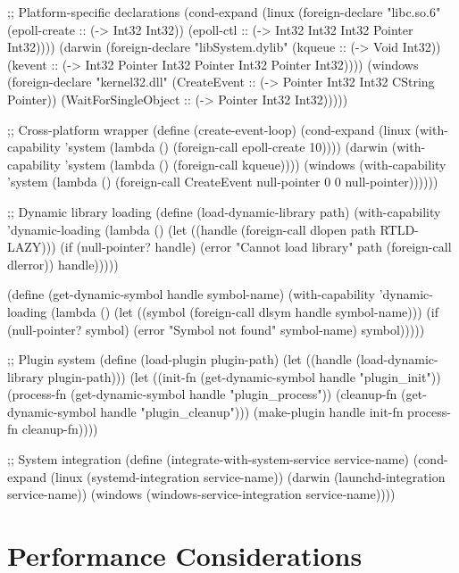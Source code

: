 \begin{example}
\begin{lambdustcode}
;; Platform-specific declarations
(cond-expand
  (linux 
    (foreign-declare "libc.so.6"
      (epoll-create :: (-> Int32 Int32))
      (epoll-ctl :: (-> Int32 Int32 Int32 Pointer Int32))))
  (darwin
    (foreign-declare "libSystem.dylib"
      (kqueue :: (-> Void Int32))
      (kevent :: (-> Int32 Pointer Int32 Pointer Int32 Pointer Int32))))
  (windows
    (foreign-declare "kernel32.dll"
      (CreateEvent :: (-> Pointer Int32 Int32 CString Pointer))
      (WaitForSingleObject :: (-> Pointer Int32 Int32)))))

;; Cross-platform wrapper
(define (create-event-loop)
  (cond-expand
    (linux (with-capability 'system
             (lambda () (foreign-call epoll-create 10))))
    (darwin (with-capability 'system  
              (lambda () (foreign-call kqueue))))
    (windows (with-capability 'system
               (lambda () (foreign-call CreateEvent null-pointer 0 0 null-pointer))))))

;; Dynamic library loading
(define (load-dynamic-library path)
  (with-capability 'dynamic-loading
    (lambda ()
      (let ((handle (foreign-call dlopen path RTLD-LAZY)))
        (if (null-pointer? handle)
            (error "Cannot load library" path (foreign-call dlerror))
            handle)))))

(define (get-dynamic-symbol handle symbol-name)
  (with-capability 'dynamic-loading
    (lambda ()
      (let ((symbol (foreign-call dlsym handle symbol-name)))
        (if (null-pointer? symbol)
            (error "Symbol not found" symbol-name)
            symbol)))))

;; Plugin system
(define (load-plugin plugin-path)
  (let ((handle (load-dynamic-library plugin-path)))
    (let ((init-fn (get-dynamic-symbol handle "plugin_init"))
          (process-fn (get-dynamic-symbol handle "plugin_process"))
          (cleanup-fn (get-dynamic-symbol handle "plugin_cleanup")))
      (make-plugin handle init-fn process-fn cleanup-fn))))

;; System integration
(define (integrate-with-system-service service-name)
  (cond-expand
    (linux (systemd-integration service-name))
    (darwin (launchd-integration service-name))  
    (windows (windows-service-integration service-name))))
\end{lambdustcode}
\end{example}

\section{Performance Considerations}
\label{sec:ffi-performance}

